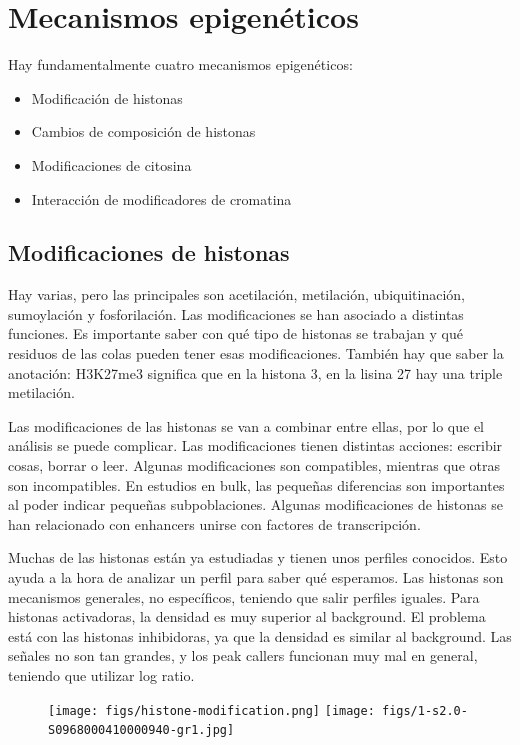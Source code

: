 \section{Mecanismos epigenéticos}
Hay fundamentalmente cuatro mecanismos epigenéticos:
\begin{itemize}
\item Modificación de histonas
\item Cambios de composición de histonas
\item Modificaciones de citosina
\item Interacción de modificadores de cromatina
\end{itemize}

\subsection{Modificaciones de histonas}
Hay varias, pero las principales son acetilación, metilación, ubiquitinación, sumoylación y fosforilación. Las modificaciones se han asociado a distintas funciones. Es importante saber con qué tipo de histonas se trabajan y qué residuos de las colas pueden tener esas modificaciones. También hay que saber la anotación: H3K27me3 significa que en la histona 3, en la lisina 27 hay una triple metilación. 

Las modificaciones de las histonas se van a combinar entre ellas, por lo que el análisis se puede complicar. Las modificaciones tienen distintas acciones: escribir cosas, borrar o leer. Algunas modificaciones son compatibles, mientras que otras son incompatibles. En estudios en bulk, las pequeñas diferencias son importantes al poder indicar pequeñas subpoblaciones. Algunas modificaciones de histonas se han relacionado con enhancers unirse con factores de transcripción. 

Muchas de las histonas están ya estudiadas y tienen unos perfiles conocidos. Esto ayuda a la hora de analizar un perfil para saber qué esperamos. Las histonas son mecanismos generales, no específicos, teniendo que salir perfiles iguales. Para histonas activadoras, la densidad es muy superior al background. El problema está con las histonas inhibidoras, ya que la densidad es similar al background. Las señales no son tan grandes, y los peak callers funcionan muy mal en general, teniendo que utilizar log ratio. 

\begin{figure}[h]
\centering
\texttt{[image: figs/histone-modification.png]}
\texttt{[image: figs/1-s2.0-S0968000410000940-gr1.jpg]}
\end{figure}

